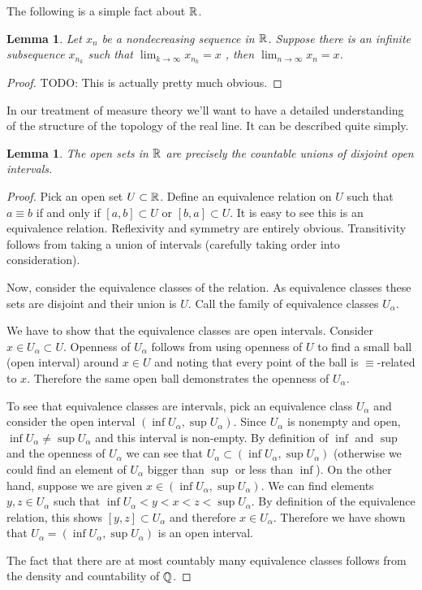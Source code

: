 \documentclass{amsart}
\newtheorem{lem}[thm]{Lemma}
\theoremstyle{remark}
\theoremstyle{definition}
\begin{document}
The following is a simple fact about $\mathbb{R}$.
\begin{lem}\label{IncreasingSequenceWithConvergentSubsequence}Let $x_n$ be a nondecreasing sequence in $\mathbb{R}$.  Suppose
  there is an infinite subsequence $x_{n_k}$ such that $\lim_{k \to
    \infty} x_{n_k} = x$ , then $\lim_{n \to \infty} x_n = x$.
\end{lem}
\begin{proof}
TODO:  This is actually pretty much obvious.
\end{proof}
In our treatment of measure theory we'll want to have a detailed
understanding of the structure of the topology of the real line.  It
can be described quite simply.
\begin{lem}The open sets in $\mathbb{R}$ are precisely the countable
  unions of disjoint open intervals.
\end{lem}
\begin{proof}Pick an open set $U \subset \mathbb{R}$.  Define an
  equivalence relation on $U$ such that $a \equiv b$ if and only if
  $[a,b] \subset U$ or $[b,a] \subset U$.  It is easy to see this is an equivalence
  relation.  Reflexivity and symmetry are entirely obvious.
  Transitivity follows from taking a union of intervals (carefully
  taking order into consideration).  

Now, consider the equivalence classes of the relation. As equivalence
classes these sets are disjoint and their union is $U$.  Call the
family of equivalence classes $U_\alpha$.

We have to show that
the equivalence classes are open intervals.  Consider $x \in U_\alpha
\subset U$.  Openness of $U_\alpha$ follows from using openness of $U$ to find a small ball (open interval) around $x \in U$ and noting that every
point of the ball is $\equiv$-related to $x$.  Therefore the same open
ball demonstrates the openness of $U_\alpha$.

To see that equivalence classes are intervals, pick an equivalence
class $U_\alpha$ and consider the open interval $(\inf U_\alpha, \sup
U_\alpha)$.  Since $U_\alpha$ is nonempty and open, $\inf U_\alpha \neq \sup
U_\alpha $ and this interval is non-empty.  By definition of $\inf$ and $\sup$ and the openness of
$U_\alpha$ we can see that $U_\alpha \subset (\inf U_\alpha, \sup
U_\alpha)$ (otherwise we could find an element of $U_\alpha$ bigger
than $\sup$ or less than $\inf$).  On the other hand, suppose we are
given $x \in (\inf U_\alpha, \sup U_\alpha)$.  We can find elements
$y,z \in U_\alpha$ such that $\inf U_\alpha  < y < x < z <\sup  U_\alpha$.
By definition of the equivalence relation, this shows $[y,z] \subset
U_\alpha$ and therefore $x \in U_\alpha$.  Therefore we have shown
that $U_\alpha =  (\inf U_\alpha, \sup U_\alpha)$ is an open interval.

The fact that there are
at most countably many equivalence classes follows from the density
and countability of $\mathbb{Q}$.
\end{proof} 
\end{document}
